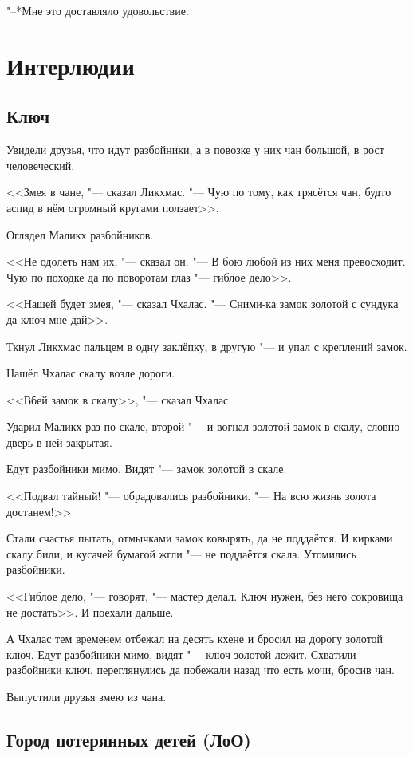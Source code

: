 \documentclass[a4paper,10pt]{book}
\begin{document}
"--*Мне это доставляло удовольствие.

\chapter{Интерлюдии}

\section{Ключ}

Увидели друзья, что идут разбойники, а в повозке у них чан большой, в рост человеческий.

<<Змея в чане, "--- сказал Ликхмас. "--- Чую по тому, как трясётся чан, будто аспид в нём огромный кругами ползает>>.

Оглядел Маликх разбойников.

<<Не одолеть нам их, "--- сказал он. "--- В бою любой из них меня превосходит. Чую по походке да по поворотам глаз "--- гиблое дело>>.

<<Нашей будет змея, "--- сказал Чхалас. "--- Сними-ка замок золотой с сундука да ключ мне дай>>.

Ткнул Ликхмас пальцем в одну заклёпку, в другую "--- и упал с креплений замок.

Нашёл Чхалас скалу возле дороги.

<<Вбей замок в скалу>>, "--- сказал Чхалас.

Ударил Маликх раз по скале, второй "--- и вогнал золотой замок в скалу, словно дверь в ней закрытая.

Едут разбойники мимо. Видят "--- замок золотой в скале. 

<<Подвал тайный! "--- обрадовались разбойники. "--- На всю жизнь золота достанем!>>

Стали счастья пытать, отмычками замок ковырять, да не поддаётся. И кирками скалу били, и кусачей бумагой жгли "--- не поддаётся скала. Утомились разбойники.

<<Гиблое дело, "--- говорят, "--- мастер делал. Ключ нужен, без него сокровища не достать>>. И поехали дальше.

А Чхалас тем временем отбежал на десять кхене и бросил на дорогу золотой ключ. Едут разбойники мимо, видят "--- ключ золотой лежит. Схватили разбойники ключ, переглянулись да побежали назад что есть мочи, бросив чан.

Выпустили друзья змею из чана.

\section{Город потерянных детей (ЛоО)}
\end{document}
